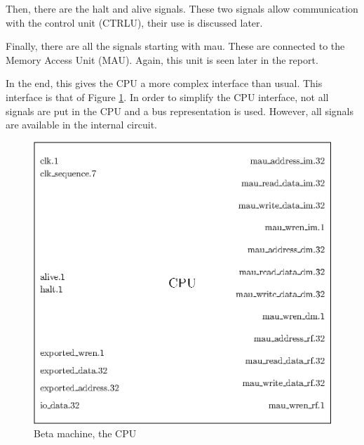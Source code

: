 Then, there are the halt and alive signals. These two signals allow communication with the control 
unit (CTRLU), their use is discussed later.

Finally, there are all the signals starting with mau. These are connected to the Memory Access Unit 
(MAU). Again, this unit is seen later in the report. 

In the end, this gives the CPU a more complex interface than usual. This interface is that of 
Figure \ref{fig:beta/interface}. In order to simplify the CPU interface, not all signals are put in 
the CPU and a bus representation is used. However, all signals are available in the internal circuit.

\begin{figure}[H]
    \centering
    \includegraphics[scale=0.8]{Chapter3-CPU/res/beta_machine}
    \caption{Beta machine, the CPU}
    \label{fig:beta/interface}
\end{figure}